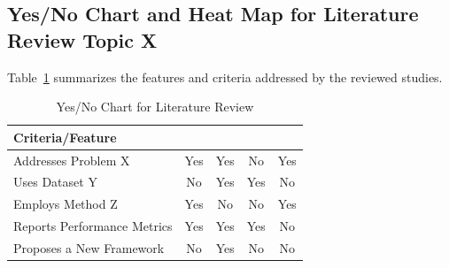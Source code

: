 \documentclass[conference]{IEEEtran}
\begin{document}
\subsection{Yes/No Chart and Heat Map for Literature Review Topic X}

Table~\ref{tab:yes_no_chart} summarizes the features and criteria addressed by the reviewed studies.

\begin{table}[htbp]
	\caption{Yes/No Chart for Literature Review}
	\label{tab:yes_no_chart}
	\centering
	\renewcommand{\arraystretch}{1.2} %
	\begin{tabularx}{\linewidth}{|X|c|c|c|c|}
		\hline
		\textbf{Criteria/Feature} & \textbf{\textcite{ref1}} & \textbf{\textcite{ref2}} & \textbf{\textcite{ref3}} & \textbf{\textcite{ref4}} \\ \hline
		Addresses Problem X       & Yes                     & Yes                     & No                      & Yes                      \\ \hline
		Uses Dataset Y            & No                      & Yes                     & Yes                     & No                       \\ \hline
		Employs Method Z          & Yes                     & No                      & No                      & Yes                      \\ \hline
		Reports Performance Metrics & Yes                   & Yes                     & Yes                     & No                       \\ \hline
		Proposes a New Framework  & No                      & Yes                     & No                      & No                       \\ \hline
	\end{tabularx}
\end{table}
\end{document}
